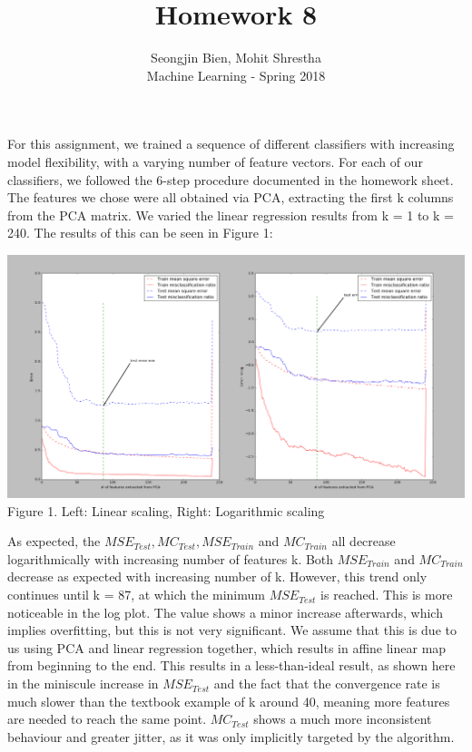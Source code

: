 \documentclass[12pt]{article}
\begin{document}
 
 
\title{Homework 8}%
\author{Seongjin Bien, Mohit Shrestha\\ %
Machine Learning - Spring 2018} %
 
\maketitle
For this assignment, we trained a sequence of different classifiers with increasing model flexibility, with a varying number of feature vectors. For each of our classifiers, we followed the 6-step procedure documented in the homework sheet. The features we chose were all obtained via PCA, extracting the first k columns from the PCA matrix. We varied the linear regression results from k = 1 to k = 240. The results of this can be seen in Figure 1:\\
\begin{center}
	\includegraphics[scale=0.30]{hw8plots.png}\\
	Figure 1. Left: Linear scaling, Right: Logarithmic scaling
\end{center}
    As expected, the $MSE_{Test}, MC_{Test}, MSE_{Train}$ and $MC_{Train}$ all decrease logarithmically with increasing number of features k. Both $MSE_{Train}$ and $MC_{Train}$ decrease as expected with increasing number of k. However, this trend only continues until k = 87, at which the minimum $MSE_{Test}$ is reached. This is more noticeable in the log plot. The value shows a minor increase afterwards, which implies overfitting, but this is not very significant. We assume that this is due to us using PCA and linear regression together, which results in affine linear map from beginning to the end. This results in a less-than-ideal result, as shown here in the miniscule increase in $MSE_{Test}$ and the fact that the convergence rate is much slower than the textbook example of k around 40, meaning more features are needed to reach the same point. $MC_{Test}$ shows a much more inconsistent behaviour and greater jitter, as it was only implicitly targeted by the algorithm. 
\end{document}
